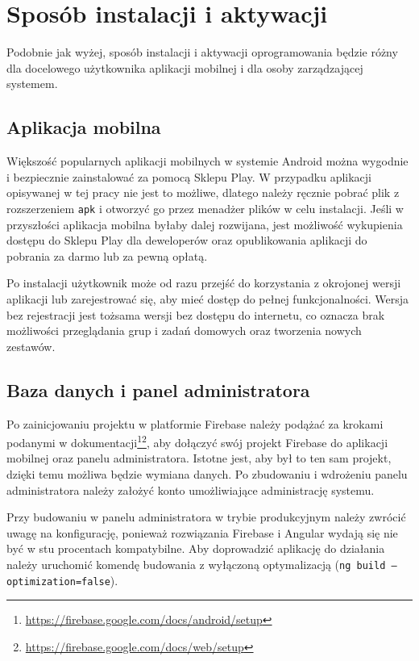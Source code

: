 \documentclass[a4paper,twoside,12pt]{book}
\begin{document}
\section{Sposób instalacji i aktywacji}

Podobnie jak wyżej, sposób instalacji i aktywacji oprogramowania będzie różny dla docelowego użytkownika aplikacji mobilnej i dla osoby zarządzającej systemem. 

\subsection{Aplikacja mobilna}
Większość popularnych aplikacji mobilnych w systemie Android można wygodnie i bezpiecznie zainstalować za pomocą Sklepu Play. W przypadku aplikacji opisywanej w tej pracy nie jest to możliwe, dlatego należy ręcznie pobrać plik z rozszerzeniem \texttt{apk} i otworzyć go przez menadżer plików w celu instalacji. Jeśli w przyszłości aplikacja mobilna byłaby dalej rozwijana, jest możliwość wykupienia dostępu do Sklepu Play dla deweloperów oraz opublikowania aplikacji do pobrania za darmo lub za pewną opłatą. 

Po instalacji użytkownik może od razu przejść do korzystania z okrojonej wersji aplikacji lub zarejestrować się, aby mieć dostęp do pełnej funkcjonalności. Wersja bez rejestracji jest tożsama wersji bez dostępu do internetu, co oznacza brak możliwości przeglądania grup i zadań domowych oraz tworzenia nowych zestawów.

\subsection{Baza danych i panel administratora}

Po zainicjowaniu projektu w platformie Firebase należy podążać za krokami podanymi w dokumentacji\footnote{\url{https://firebase.google.com/docs/android/setup}}\footnote{\url{https://firebase.google.com/docs/web/setup}}, aby dołączyć swój projekt Firebase do aplikacji mobilnej oraz panelu administratora. Istotne jest, aby był to ten sam projekt, dzięki temu możliwa będzie wymiana danych. Po zbudowaniu i wdrożeniu panelu administratora należy założyć konto umożliwiające administrację systemu. 

Przy budowaniu w panelu administratora w trybie produkcyjnym należy zwrócić uwagę na konfigurację, ponieważ rozwiązania Firebase i Angular wydają się nie być w stu procentach kompatybilne. Aby doprowadzić aplikację do działania należy uruchomić komendę budowania z wyłączoną optymalizacją (\texttt{ng build --optimization=false}).
\end{document}
